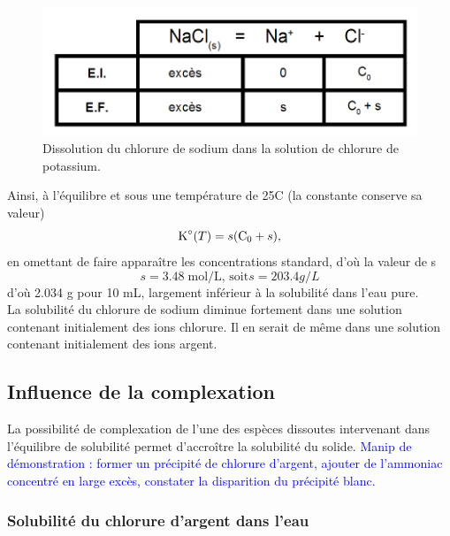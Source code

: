\documentclass[11pt,a4paper]{report}
\begin{document}
\begin{figure}[h!]
	\begin{center}
  		\includegraphics[scale = 0.5]{ion_commun.png}
		\caption{Dissolution du chlorure de sodium dans la solution de chlorure de potassium.}
	\end{center}
\end{figure}

Ainsi, à l'équilibre et sous une température de 25\degree C (la constante conserve sa valeur)
\begin{equation}
	\text{K}\degree (T) = s(\text{C}_0 + s),
\end{equation}
en omettant de faire apparaître les concentrations standard, d'où la valeur de s 
\begin{equation}
	s = 3.48\;\text{mol/L, soit} s = 203.4 g/L
\end{equation}
d'où 2.034 g pour 10 mL, largement inférieur à la solubilité dans l'eau pure.\\

La solubilité du chlorure de sodium diminue fortement dans une solution contenant initialement des ions chlorure. Il en serait de même dans une solution contenant initialement des ions argent.

\newpage
\subsection{Influence de la complexation}

La possibilité de complexation de l'une des espèces dissoutes intervenant dans l'équilibre de solubilité permet d'accroître la solubilité du solide. \textcolor{blue}{Manip de démonstration : former un précipité de chlorure d'argent, ajouter de l'ammoniac concentré en large excès, constater la disparition du précipité blanc.} 

\subsubsection*{Solubilité du chlorure d'argent dans l'eau} 
\end{document}
